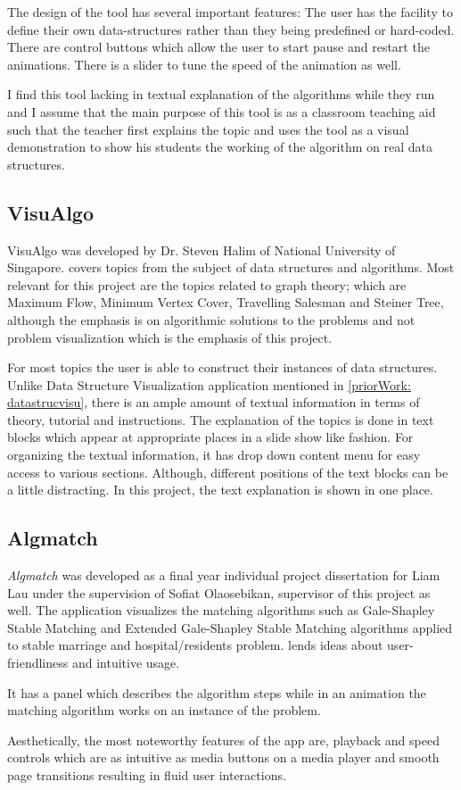 The design of the tool has several important features: The user has the
facility to define their own data-structures rather than they being predefined or
hard-coded. There are control buttons which allow the user to start pause and
restart the animations. There is a slider to tune the speed of the animation as
well.

I find this tool lacking in textual explanation of the algorithms while they run and I assume that the main purpose of this tool is as a classroom teaching aid such that the
teacher first explains the topic and uses the tool as a visual demonstration to
show his students the working of the algorithm on real data structures.

\subsection{VisuAlgo}
\label{priorWork: visualgo}
VisuAlgo was developed by Dr. Steven Halim of National University of
Singapore. \cite{HalimVisu} covers topics from the
subject of data structures and algorithms. Most relevant for this project are
the topics related to graph theory; which are Maximum Flow, Minimum Vertex
Cover, Travelling Salesman and Steiner Tree, although the emphasis is on
algorithmic solutions to the problems and not problem visualization which is
the emphasis of this project.

For most topics the user is able to construct their instances of data structures.
Unlike Data Structure Visualization application mentioned in
\autoref{priorWork: datastrucvisu}, there is an ample amount of textual
information in terms of theory, tutorial and instructions. The explanation of
the topics is done in text blocks which appear at appropriate places in a slide
show like fashion. For organizing the textual information, it has drop down
content menu for easy access to various sections. Although, different positions
of the text blocks can be a little distracting. In this project, the text explanation
is shown in one place.


\subsection{Algmatch}
\label{priorWork: algmatch}
\emph{Algmatch} was developed as a final year individual project dissertation for
Liam Lau under the supervision of Sofiat Olaosebikan, supervisor of this project as well. The application
visualizes the matching algorithms such as Gale-Shapley Stable Matching and
Extended Gale-Shapley Stable Matching algorithms applied to stable marriage and
hospital/residents problem. \cite{LiamApp}
lends ideas about user-friendliness and intuitive usage.

It has a panel which describes the algorithm steps while in an animation the
matching algorithm works on an instance of the problem.

Aesthetically, the most noteworthy features of the app are, playback and speed
controls which are as intuitive as media buttons on a media player and smooth
page transitions resulting in fluid user interactions.
